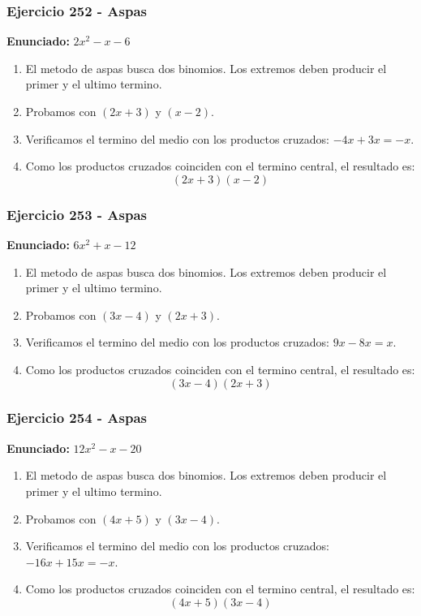 \documentclass[11pt,a4paper]{article}
\begin{document}
\vspace{0.2cm}
\subsubsection*{Ejercicio 252 - Aspas}
\textbf{Enunciado:} $ 2 x^{2} - x - 6 $\par
\begin{enumerate}[leftmargin=2em]
\item El metodo de aspas busca dos binomios. Los extremos deben producir el primer y el ultimo termino.
\item Probamos con \((2 x + 3)\) y \((x - 2)\).
\item Verificamos el termino del medio con los productos cruzados: \(- 4 x+3 x=- x\).
\item Como los productos cruzados coinciden con el termino central, el resultado es: \[\boxed{\left(2 x + 3\right)\left(x - 2\right)}\]
\end{enumerate}

\vspace{0.2cm}
\subsubsection*{Ejercicio 253 - Aspas}
\textbf{Enunciado:} $ 6 x^{2} + x - 12 $\par
\begin{enumerate}[leftmargin=2em]
\item El metodo de aspas busca dos binomios. Los extremos deben producir el primer y el ultimo termino.
\item Probamos con \((3 x - 4)\) y \((2 x + 3)\).
\item Verificamos el termino del medio con los productos cruzados: \(9 x- 8 x=x\).
\item Como los productos cruzados coinciden con el termino central, el resultado es: \[\boxed{\left(3 x - 4\right)\left(2 x + 3\right)}\]
\end{enumerate}

\vspace{0.2cm}
\subsubsection*{Ejercicio 254 - Aspas}
\textbf{Enunciado:} $ 12 x^{2} - x - 20 $\par
\begin{enumerate}[leftmargin=2em]
\item El metodo de aspas busca dos binomios. Los extremos deben producir el primer y el ultimo termino.
\item Probamos con \((4 x + 5)\) y \((3 x - 4)\).
\item Verificamos el termino del medio con los productos cruzados: \(- 16 x+15 x=- x\).
\item Como los productos cruzados coinciden con el termino central, el resultado es: \[\boxed{\left(4 x + 5\right)\left(3 x - 4\right)}\]
\end{enumerate}
\end{document}
